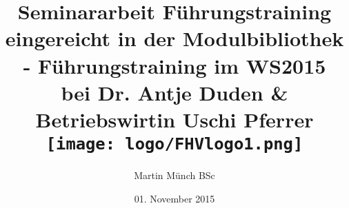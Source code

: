 \title{
	{Seminararbeit Führungstraining}\\
	{\large eingereicht in der Modulbibliothek - Führungstraining im WS2015}\\
	{\large bei Dr. Antje Duden \& Betriebswirtin Uschi Pferrer}\\ [1cm]
	{\texttt{[image: logo/FHVlogo1.png]}} \\ [1cm]
}
\author{Martin Münch BSc}
\date{01. November 2015}



\maketitle

